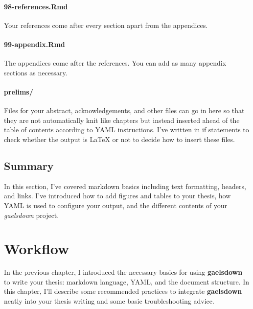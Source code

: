 \documentclass[12pt, oneside]{queensuthesis}
\numberwithin{equation}{chapter}       %
\begin{document}
\hypertarget{references.rmd}{%
\subsubsection{98-references.Rmd}\label{references.rmd}}

Your references come after every section apart from the appendices.

\hypertarget{appendix.rmd}{%
\subsubsection{99-appendix.Rmd}\label{appendix.rmd}}

The appendices come after the references. You can add as many appendix sections as necessary.

\hypertarget{prelims}{%
\subsubsection{prelims/}\label{prelims}}

Files for your abstract, acknowledgements, and other files can go in here so that they are not automatically knit like chapters but instead inserted ahead of the table of contents according to YAML instructions. I've written in if statements to check whether the output is LaTeX or not to decide how to insert these files.

\hypertarget{summary}{%
\section{Summary}\label{summary}}

In this section, I've covered markdown basics including text formatting, headers, and links. I've introduced how to add figures and tables to your thesis, how YAML is used to configure your output, and the different contents of your \emph{gaelsdown} project.

\hypertarget{workflow}{%
\chapter{Workflow}\label{workflow}}

In the previous chapter, I introduced the necessary basics for using \textbf{gaelsdown} to write your thesis: markdown language, YAML, and the document structure. In this chapter, I'll describe some recommended practices to integrate \textbf{gaelsdown} neatly into your thesis writing and some basic troubleshooting advice.
\end{document}
